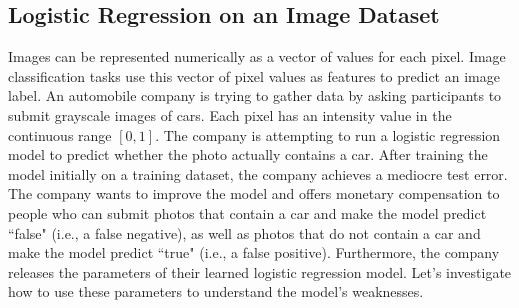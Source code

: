 \documentclass[11pt,addpoints,answers]{exam}
\begin{document}
 \subsection{Logistic Regression on an Image Dataset}
\label{sec:images}

Images can be represented numerically as a vector of values for each pixel. Image classification tasks use this vector of pixel values as features to predict an image label.  
An automobile company is trying to gather data by asking participants to submit grayscale images of cars. Each pixel has an intensity value in the continuous range $[0,1]$. The company is attempting to run a logistic regression model to predict whether the photo actually contains a car. After training the model initially on a training dataset, the company achieves a mediocre test error. The company wants to improve the model and offers monetary compensation to people who can submit photos that contain a car and make the model predict ``false" (i.e., a false negative), as well as photos that do not contain a car and make the model predict ``true" (i.e., a false positive). Furthermore, the company releases the parameters of their learned logistic regression model. Let's investigate how to use these parameters to understand the model's weaknesses.
\end{document}
